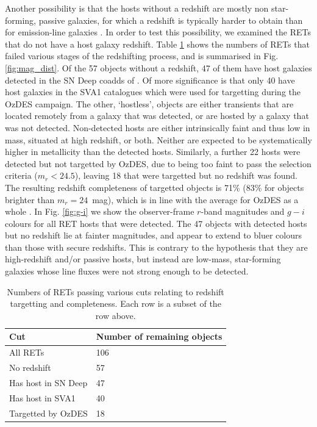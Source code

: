 \documentclass[fleqn,usenatbib,]{mnras}
\begin{document}
Another possibility is that the hosts without a redshift are mostly non star-forming, passive galaxies, for which a redshift is typically harder to obtain than for emission-line galaxies \citep{Yuan2015,Childress2017,Lidman2020}. In order to test this possibility, we examined the RETs that do not have a host galaxy redshift. Table \ref{tab:z_cuts} shows the numbers of RETs that failed various stages of the redshifting process, and is summarised in Fig. \ref{fig:mag_dist}. Of the 57 objects without a redshift, 47 of them have host galaxies detected in the SN Deep coadds of . Of more significance is that only 40 have host galaxies in the SVA1 catalogues which were used for targetting during the OzDES campaign. The other, `hostless', objects are either transients that are located remotely from a galaxy that was detected, or are hosted by a galaxy that was not detected. Non-detected hosts are either intrinsically faint and thus low in mass, situated at high redshift, or both. Neither are expected to be systematically higher in metallicity than the detected hosts. Similarly, a further 22 hosts were detected but not targetted by OzDES, due to being too faint to pass the selection criteria ($m_r < 24.5$), leaving 18 that were targetted but no redshift was found. The resulting redshift completeness of targetted objects is 71\% (83\% for objects brighter than $m_r = 24$~mag), which is in line with the average for OzDES as a whole \citep{Lidman2020}.
In Fig. \ref{fig:g-i} we show the observer-frame $r$-band magnitudes and $g-i$ colours for all RET hosts that were detected. The 47 objects with detected hosts but no redshift lie at fainter magnitudes, and appear to extend to bluer colours than those with secure redshifts. This is contrary to the hypothesis that they are high-redshift and/or passive hosts, but instead are low-mass, star-forming galaxies whose line fluxes were not strong enough to be detected. 
 

\begin{table}
    \centering
    \begin{tabular}{l|l}
         Cut &  Number of remaining objects \\
        \toprule
        All RETs & 106 \\
        No redshift   & 57\\
        Has host in SN Deep & 47\\
        Has host in SVA1 & 40 \\
        Targetted by OzDES & 18 \\
        \bottomrule
    \end{tabular}
    \caption{Numbers of RETs passing various cuts relating to redshift targetting and completeness. Each row is a subset of the row above.}
    \label{tab:z_cuts}
\end{table}
\end{document}
